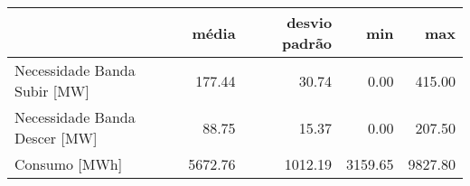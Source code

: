 \begin{tabular}{lrrrr}
\toprule
 & média & desvio padrão & min & max \\
\midrule
Necessidade Banda Subir [MW] & 177.44 & 30.74 & 0.00 & 415.00 \\
Necessidade Banda Descer [MW] & 88.75 & 15.37 & 0.00 & 207.50 \\
Consumo [MWh] & 5672.76 & 1012.19 & 3159.65 & 9827.80 \\
\bottomrule
\end{tabular}

